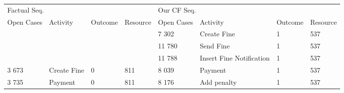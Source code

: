 \begin{tabular}{llllllll}
\toprule
\multicolumn{4}{l}{Factual Seq.} & \multicolumn{4}{l}{Our CF Seq.} \\
Open Cases & Activity & Outcome & Resource & Open Cases & Activity & Outcome & Resource \\
\midrule
 &  &  &  & 7 302 & Create Fine & 1 & 537 \\
 &  &  &  & 11 780 & Send Fine & 1 & 537 \\
 &  &  &  & 11 788 & Insert Fine Notification & 1 & 537 \\
3 673 & Create Fine & 0 & 811 & 8 039 & Payment & 1 & 537 \\
3 735 & Payment & 0 & 811 & 8 176 & Add penalty & 1 & 537 \\
\bottomrule
\end{tabular}
